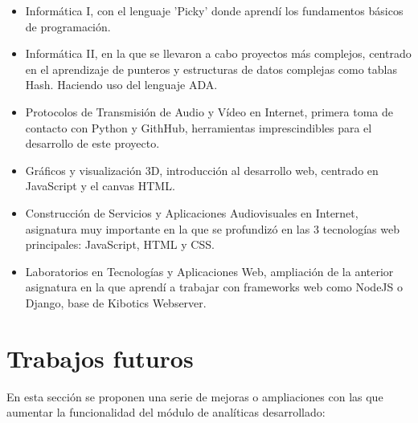 \documentclass[11pt,a4paper]{book}
\begin{document}
			\begin{itemize}
				\item Informática I, con el lenguaje ’Picky’ donde aprendí los fundamentos básicos de programación.	
				
				\item Informática II, en la que se llevaron a cabo proyectos más complejos, centrado en el aprendizaje de punteros y estructuras de datos complejas como tablas Hash. Haciendo uso del lenguaje ADA.	
						
				\item Protocolos de Transmisión de Audio y Vídeo en Internet, primera toma de contacto con Python y GithHub, herramientas imprescindibles para el desarrollo de este proyecto.
							
				\item Gráficos y visualización 3D, introducción al desarrollo web, centrado en JavaScript y el canvas HTML.			
			
				\item Construcción de Servicios y Aplicaciones Audiovisuales en Internet, asignatura muy importante en la que se profundizó en las 3 tecnologías web principales: JavaScript, HTML y CSS.
				
				\item Laboratorios en Tecnologías y Aplicaciones Web, ampliación de la anterior asignatura en la que aprendí a trabajar con frameworks web como NodeJS o Django, base de Kibotics Webserver.
			\end{itemize}
			
			
		\section{Trabajos futuros}
			En esta sección se proponen una serie de mejoras o ampliaciones con las que aumentar la funcionalidad del módulo de analíticas desarrollado:
			
\end{document}
